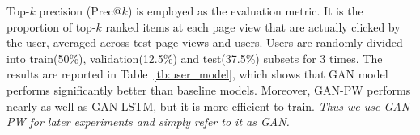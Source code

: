 \documentclass{article} %
\newcommand{\red}[1]{{\color{red}#1}}
\newcommand{\Li}[1]{{\color{cyan}{\bf\sf [Li: #1]}}}
\begin{document}


Top-$k$ precision (Prec@$k$) is employed as the evaluation metric. It is the proportion of top-$k$ ranked items at each page view that are actually clicked by the user, averaged across test page views and users. Users are randomly divided into train(50\%), validation(12.5\%) and test(37.5\%) subsets for 3 times. The results are reported in Table~\ref{tb:user_model}, which shows that {\small GAN} model performs significantly better than baseline models. Moreover, {\small GAN-PW} performs nearly as well as {\small GAN-LSTM}, but it is more efficient to train. \emph{Thus we use {\small GAN-PW} for later experiments and simply refer to it as {\small GAN}.} 

\end{document}
